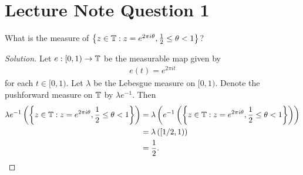 \section{Lecture Note Question 1}
\horz
What is the measure of $\left\{ z\in \mathbb T : z=e^{2\pi i \theta}, \frac{1}{2} \le \theta < 1 \right\}$?
\horz
\begin{proof}[Solution]
Let $e : [0,1) \to \mathbb T$ be the measurable map given by 
\begin{align*}
e(t)=e^{2\pi i t}
\end{align*}
for each $t \in [0,1)$. Let $\lambda$ be the Lebesgue measure on $[0,1)$. Denote the pushforward measure on $\mathbb T$ by $\lambda e^{-1}$. Then
\begin{align*}
\lambda e^{-1} \left( \left\{ z\in \mathbb T : z=e^{2\pi i \theta}, \frac{1}{2} \le \theta < 1 \right\} \right) &= \lambda \left( e^{-1} \left(  \left\{ z\in \mathbb T : z=e^{2\pi i \theta}, \frac{1}{2} \le \theta < 1 \right\}\right) \right) \\
&= \lambda \left( [1/2,1) \right) \\
&= \frac{1}{2}.
\end{align*}
\end{proof}
